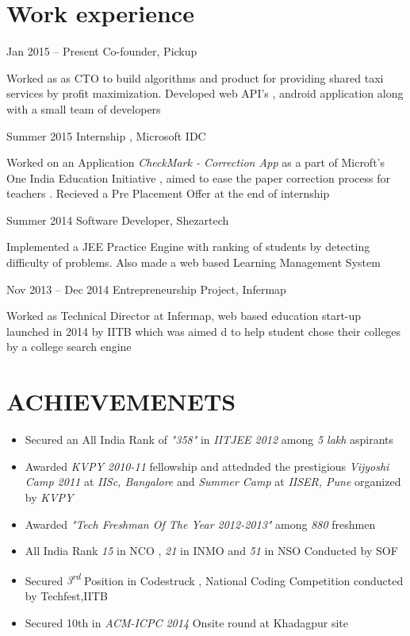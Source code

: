 \documentclass[fontsize=10pt]{tccv}
\begin{document}
\section{Work experience}

\begin{eventlist}

\item{Jan 2015 -- Present}
     {}
     {Co-founder, Pickup}

Worked as as CTO to build algorithms and product for providing shared taxi services by profit maximization. Developed web API’s , android application along with a small team of developers

\item{Summer 2015}
     {}
     {Internship , Microsoft IDC}

Worked on an Application \textit{CheckMark - Correction App} as a part of Microft’s One India Education Initiative , aimed to ease the paper correction process for teachers . Recieved a Pre Placement Offer at the end of internship

\item{Summer 2014}
     {}
     {Software Developer, Shezartech }

Implemented a JEE Practice Engine with ranking of students by detecting difficulty of problems. Also made a web based Learning Management System

\item{Nov 2013 -- Dec 2014}
     {}
     {Entrepreneurship Project, Infermap}

Worked as Technical Director at Infermap, web based education start-up launched in 2014 by IITB which was aimed d to help student chose their colleges by a college search engine

\end{eventlist}

\vspace{-9mm}
\section{ACHIEVEMENETS}
\begin{itemize}
\itemsep-0.3em
\item Secured an All India Rank of {\it "358"} in {\it IITJEE 2012} among {\it 5 lakh} aspirants
\item Awarded {\it KVPY 2010-11} fellowship and  attednded the prestigious {\it Vijyoshi Camp 2011} at {\it IISc, Bangalore} and {\it Summer 
Camp} at {\it IISER, Pune} organized by {\it KVPY}
\item Awarded {\it "Tech Freshman Of The Year 2012-2013"} among {\it 880} freshmen 
\item All India Rank {\it 15} in NCO , {\it 21} in INMO and {\it 51} in NSO Conducted by SOF
\item Secured {\it 3\textsuperscript{rd}} Position in Codestruck , National Coding Competition conducted by Techfest,IITB
\item Secured 10th in {\it ACM-ICPC 2014} Onsite round at Khadagpur site
\end{itemize}
\end{document}
